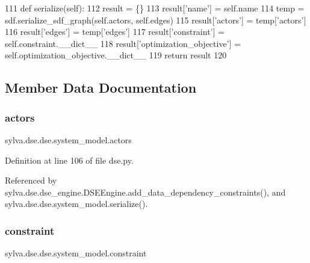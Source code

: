 \begin{DoxyCode}
111     \textcolor{keyword}{def }serialize(self):
112         result = \{\}
113         result[\textcolor{stringliteral}{'name'}] = self.name
114         temp = sdf.serialize\_sdf\_graph(self.actors, self.edges)
115         result[\textcolor{stringliteral}{'actors'}] = temp[\textcolor{stringliteral}{'actors'}]
116         result[\textcolor{stringliteral}{'edges'}] = temp[\textcolor{stringliteral}{'edges'}]
117         result[\textcolor{stringliteral}{'constraint'}] = self.constraint.\_\_dict\_\_
118         result[\textcolor{stringliteral}{'optimization\_objective'}] = self.optimization\_objective.\_\_dict\_\_
119         \textcolor{keywordflow}{return} result
120 
\end{DoxyCode}


\subsection{Member Data Documentation}
\mbox{\label{classsylva_1_1dse_1_1dse_1_1system__model_a5ca9bb6295d4575df249f2f3326721a2}} 
\subsubsection{\texorpdfstring{actors}{actors}}
{\footnotesize\ttfamily sylva.\+dse.\+dse.\+system\+\_\+model.\+actors}



Definition at line 106 of file dse.\+py.



Referenced by sylva.\+dse.\+dse\+\_\+engine.\+D\+S\+E\+Engine.\+add\+\_\+data\+\_\+dependency\+\_\+constraints(), and sylva.\+dse.\+dse.\+system\+\_\+model.\+serialize().

\mbox{\label{classsylva_1_1dse_1_1dse_1_1system__model_a3275b1b0df6c3c2d16668210db33e644}} 
\subsubsection{\texorpdfstring{constraint}{constraint}}
{\footnotesize\ttfamily sylva.\+dse.\+dse.\+system\+\_\+model.\+constraint}



